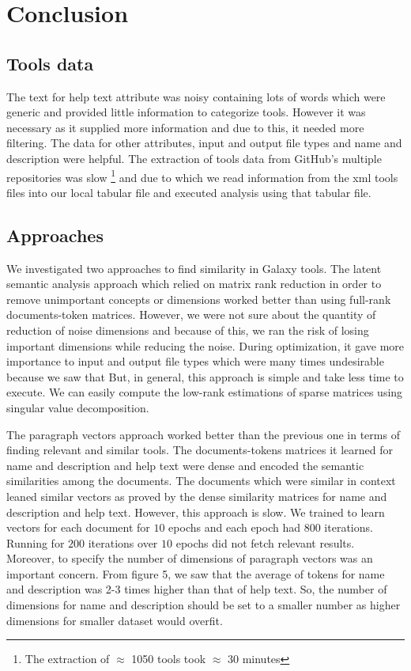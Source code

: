 \chapter{Conclusion}
\section{Tools data}
The text for help text attribute was noisy containing lots of words which were generic and provided little information to categorize tools. However it was necessary as it supplied more information and due to this, it needed more filtering. The data for other attributes, input and output file types and name and description were helpful. The extraction of tools data from GitHub's multiple repositories was slow \footnote{The extraction of $\approx$ 1050 tools  took $\approx$ 30 minutes} and due to which we read information from the xml tools files into our local tabular file and executed analysis using that tabular file.

\section{Approaches}
We investigated two approaches to find similarity in Galaxy tools. The latent semantic analysis approach which relied on matrix rank reduction in order to remove unimportant concepts or dimensions worked better than using full-rank documents-token matrices. However, we were not sure about the quantity of reduction of noise dimensions and because of this, we ran the risk of losing important dimensions while reducing the noise. During optimization, it gave more importance to input and output file types which were many times undesirable because we saw that 
But, in general, this approach is simple and take less time to execute. We can easily compute the low-rank estimations of sparse matrices using singular value decomposition. 

The paragraph vectors approach worked better than the previous one in terms of finding relevant and similar tools. The documents-tokens matrices it learned for name and description and help text were dense and encoded the semantic similarities among the documents. The documents which were similar in context leaned similar vectors as proved by the dense similarity matrices for name and description and help text. However, this approach is slow. We trained to learn vectors for each document for $10$ epochs and each epoch had $800$ iterations. Running for $200$ iterations over $10$ epochs did not fetch relevant results. Moreover, to specify the number of dimensions of paragraph vectors was an important concern. From figure 5, we saw that the average of tokens for name and description was 2-3 times higher than that of help text. So, the number of dimensions for name and description should be set to a smaller number as higher dimensions for smaller dataset would overfit.

